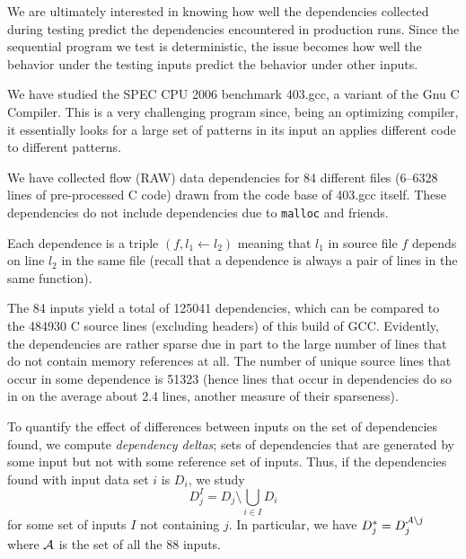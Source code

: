 \documentclass[times, 10pt,twocolumn]{article}
\begin{document}
We are ultimately interested in knowing how well the dependencies
collected during testing predict the dependencies encountered in
production runs.  Since the sequential program we test is
deterministic, the issue becomes how well the behavior under the
testing inputs predict the behavior under other inputs.

We have studied the SPEC CPU 2006
benchmark 403.gcc, a variant of the Gnu C
Compiler. This is a very challenging program since, being an
optimizing compiler, it essentially looks for a large set of patterns
in its input an applies different code to different patterns.

We have collected flow (RAW) data dependencies for 84 different files
(6--6328 lines of pre-processed C code) drawn from the code base of
403.gcc itself. These dependencies do not include dependencies due to
{\tt malloc} and friends.

Each dependence is a triple $(f, l_1 \leftarrow l_2)$
meaning that $l_1$ in source file $f$ depends on line
$l_2$ in the same file (recall that a dependence is always a
pair of lines in the same function). 

The 84 inputs yield a total of 125041 dependencies, which
can be compared to the 484930 C source lines (excluding headers) of
this build of GCC. Evidently, the dependencies are rather sparse due
in part to the large number of lines that do not contain memory references at all.
The number of unique source lines that occur in some dependence is
51323 (hence lines that occur in dependencies do so in on the average
about 2.4 lines, another measure of their sparseness).

To quantify the effect of differences between inputs on the set of 
dependencies found, we compute {\em dependency deltas}; sets of
dependencies that are generated by some input but not with some
reference set of inputs. Thus, if the dependencies found with input data set $i$ is
$D_i$, we study \[D_j^I = D_j \setminus \bigcup_{i \in I} D_i\] for
some set of inputs $I$ not containing $j$. In particular, we have
$D_j^\ast = D_j^{{\cal A} \setminus j}$ where $\cal A$ is the set of
all the 88 inputs.
\end{document}
